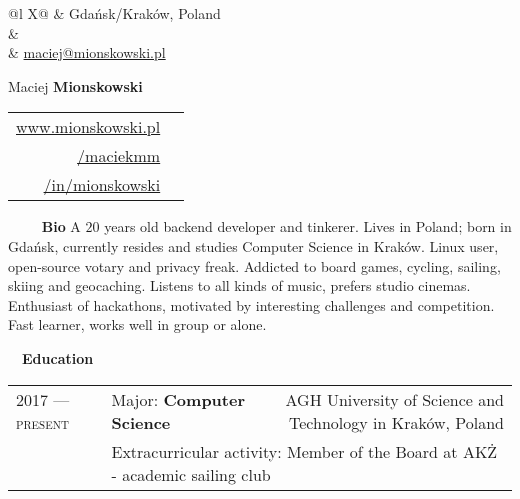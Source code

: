 \documentclass[a4paper, 11pt]{article}
\newcommand{\sectitle}[2]{\large{#1} \ \ \Large{\textbf{#2}}}
\begin{document}
	\pagestyle{fancy}

	\begin{center}
	\begin{multicols}{3}
		\begin{tabularx}{\linewidth}{@{}l X@{}}
			\faMapMarker & Gdańsk/Kraków, Poland \\
			\IfFileExists{confidential.tex}{\faPhone & \href{tel:\phoneNumber}{\prettyPhoneNumber} \\}{}
			\faEnvelope	 & \href{mailto:maciej@mionskowski.pl}{maciej@mionskowski.pl} \\
		\end{tabularx} \vfill \null

		\columnbreak
			{\Huge{Maciej \textbf{Mionskowski}}}
		\columnbreak

		\begin{tabularx}{\linewidth}{R | r}
				\href{https://www.mionskowski.pl}{www.mionskowski.pl} & \faLink \\
				\href{https://www.github.com/maciekmm}{/maciekmm} & \faGithub \\
				\href{https://www.linkedin.com/in/mionskowski}{/in/mionskowski} & \faLinkedin \\
		\end{tabularx} \vfill \null
	\end{multicols}
	\end{center}

	\begin{section}{\sectitle{\ \faUser}{\ Bio}}
		A $20$ years old backend developer and tinkerer. Lives in Poland; born in Gdańsk, currently resides and studies Computer Science in Kraków. Linux user, open-source votary and privacy freak. Addicted to board games, cycling, sailing, skiing and geocaching. Listens to all kinds of music, prefers studio cinemas. Enthusiast of hackathons, motivated by interesting challenges and competition. Fast learner, works well in group or alone.
	\end{section}

	\newcommand{\education}[6]{
		\textsc{#1 --- #2} & #3: \textbf{#4} & \small{#5} \\[-0.5ex]
		\ & \multicolumn{2}{l}{\footnotesize Extracurricular activity: #6}\\
	}

	\begin{section}{\sectitle{\faGraduationCap}{Education}}
		\begin{tabularx}{\linewidth}{@{}p{2.9cm} | X  r}
			\education{2017}{present}{Major}{Computer Science}{AGH University of Science and Technology in Kraków, Poland}{Member of the Board at AKŻ - academic sailing club }
		\end{tabularx}
	\end{section}
\end{document}
